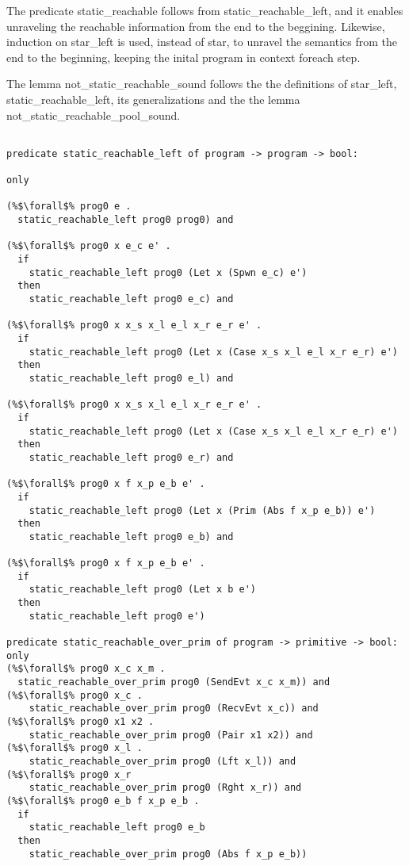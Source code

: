 \documentclass{article}
\begin{document}
The predicate static\_reachable follows
from static\_reachable\_left, and it enables unraveling the reachable
information from the end to the beggining.  Likewise, induction on star\_left is used, instead
of star, to unravel the semantics from the end to the beginning, keeping the inital program in
context foreach step. 

The lemma not\_static\_reachable\_sound follows the the definitions of star\_left,
static\_reachable\_left, its generalizations and the the lemma not\_static\_reachable\_pool\_sound.


\begin{lstlisting}[language=logic, style=codestyle1, escapechar=\%]

predicate static_reachable_left of program -> program -> bool:

only

(%$\forall$% prog0 e .
  static_reachable_left prog0 prog0) and

(%$\forall$% prog0 x e_c e' .
  if 
    static_reachable_left prog0 (Let x (Spwn e_c) e')
  then
    static_reachable_left prog0 e_c) and

(%$\forall$% prog0 x x_s x_l e_l x_r e_r e' .
  if
    static_reachable_left prog0 (Let x (Case x_s x_l e_l x_r e_r) e')
  then
    static_reachable_left prog0 e_l) and

(%$\forall$% prog0 x x_s x_l e_l x_r e_r e' .
  if
    static_reachable_left prog0 (Let x (Case x_s x_l e_l x_r e_r) e')
  then
    static_reachable_left prog0 e_r) and

(%$\forall$% prog0 x f x_p e_b e' .
  if
    static_reachable_left prog0 (Let x (Prim (Abs f x_p e_b)) e')
  then
    static_reachable_left prog0 e_b) and

(%$\forall$% prog0 x f x_p e_b e' .
  if
    static_reachable_left prog0 (Let x b e')
  then
    static_reachable_left prog0 e')

predicate static_reachable_over_prim of program -> primitive -> bool:
only
(%$\forall$% prog0 x_c x_m .
  static_reachable_over_prim prog0 (SendEvt x_c x_m)) and
(%$\forall$% prog0 x_c .
    static_reachable_over_prim prog0 (RecvEvt x_c)) and
(%$\forall$% prog0 x1 x2 .
    static_reachable_over_prim prog0 (Pair x1 x2)) and
(%$\forall$% prog0 x_l .
    static_reachable_over_prim prog0 (Lft x_l)) and
(%$\forall$% prog0 x_r
    static_reachable_over_prim prog0 (Rght x_r)) and
(%$\forall$% prog0 e_b f x_p e_b . 
  if
    static_reachable_left prog0 e_b 
  then
    static_reachable_over_prim prog0 (Abs f x_p e_b))


\end{lstlisting}
\end{document}
